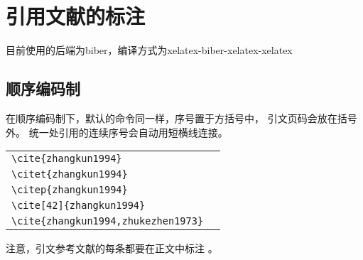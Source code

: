 \chapter{引用文献的标注}

  目前使用的后端为biber，编译方式为xelatex-biber-xelatex-xelatex
  
  
  \section{顺序编码制}
  
  在顺序编码制下，默认的命令同一样，序号置于方括号中，
  引文页码会放在括号外。
  统一处引用的连续序号会自动用短横线连接。
  
  \begin{tabular}{l@{\quad$\Rightarrow$\quad}l}
    \verb|\cite{zhangkun1994}|               & \cite{zhangkun1994}               \\
    \verb|\citet{zhangkun1994}|              & \citet{zhangkun1994}              \\
    \verb|\citep{zhangkun1994}|              & \citep{zhangkun1994}              \\
    \verb|\cite[42]{zhangkun1994}|           & \cite[42]{zhangkun1994}           \\
    \verb|\cite{zhangkun1994,zhukezhen1973}| & \cite{zhangkun1994,zhukezhen1973} \\
  \end{tabular}


  注意，引文参考文献的每条都要在正文中标注
  \cite{zhangkun1994,zhukezhen1973,dupont1974bone,zhengkaiqing1987,%
    jiangxizhou1980,jianduju1994,merkt1995rotational,mellinger1996laser,%
    bixon1996dynamics,mahui1995,carlson1981two,taylor1983scanning,%
    taylor1981study,shimizu1983laser,atkinson1982experimental,%
    kusch1975perturbations,guangxi1993,huosini1989guwu,wangfuzhi1865songlun,%
    zhaoyaodong1998xinshidai,biaozhunhua2002tushu,chubanzhuanye2004,%
    who1970factors,peebles2001probability,baishunong1998zhiwu,%
    weinstein1974pathogenic,hanjiren1985lun,dizhi1936dizhi,%
    tushuguan1957tushuguanxue,aaas1883science,fugang2000fengsha,%
    xiaoyu2001chubanye,oclc2000about,scitor2000project%
  }。
